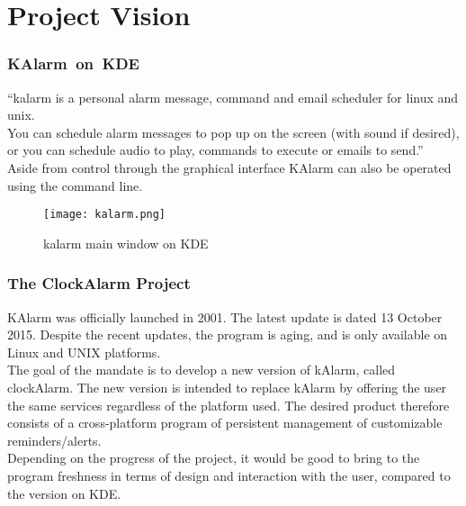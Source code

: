\section{Project Vision}
\subsubsection{KAlarm~on~KDE}

``\gls{kalarm} is a personal alarm message, command and email scheduler for
\gls{linux} and \gls{unix}. \\ You can schedule alarm messages to pop up on the
screen (with sound if desired), or you can schedule audio to play, commands to
execute or emails to send.''~\cite{kalarm_handbook}\\

Aside from control through the graphical interface KAlarm can also be operated
using the command line.

\begin{figure}[h]
    \centering
    \caption{\gls{kalarm} main window on KDE}
    \texttt{[image: kalarm.png]}
\end{figure}

\subsubsection{The ClockAlarm Project}
KAlarm was officially launched in 2001. The latest update is dated 13 October
2015. Despite the recent updates, the program is aging, and is only available
on Linux and UNIX platforms.\\ The goal of the mandate is to develop a new
version of kAlarm, called clockAlarm. The new version is intended to replace
kAlarm by offering the user the same services regardless of the platform used.
The desired product therefore consists of a cross-platform program of
persistent management of customizable reminders/alerts.\\ Depending on the
progress of the project, it would be good to bring to the program freshness in
terms of design and interaction with the user, compared to the version on
KDE.\@
